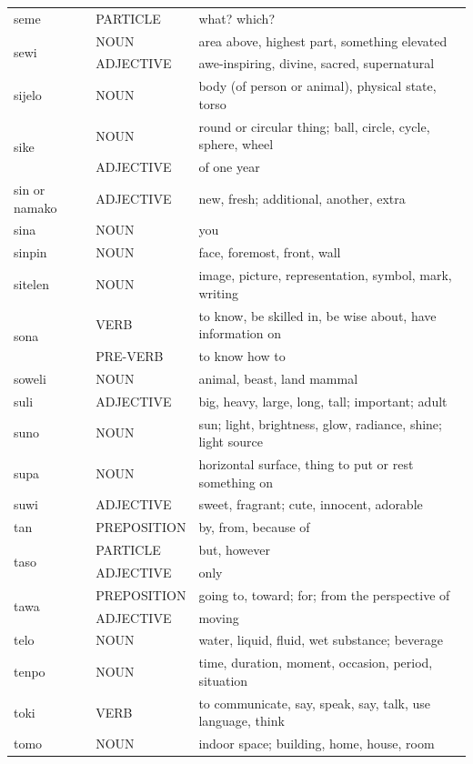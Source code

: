 \documentclass[14pt, a4paper]{extreport}
\begin{document}
\begin{longtable}{llp{10cm}}
  seme & PARTICLE & what? which? \\
  \multirow[t]{2}{*}{sewi} & NOUN & area above, highest part, something elevated \\
  & ADJECTIVE & awe-inspiring, divine, sacred, supernatural \\
  sijelo & NOUN & body (of person or animal), physical state, torso \\
  \multirow[t]{2}{*}{sike} & NOUN & round or circular thing; ball, circle, cycle, sphere, wheel \\
  & ADJECTIVE & of one year \\
  sin or namako & ADJECTIVE & new, fresh; additional, another, extra \\
  sina & NOUN & you \\
  sinpin & NOUN & face, foremost, front, wall \\
  sitelen & NOUN & image, picture, representation, symbol, mark, writing \\
  \multirow[t]{2}{*}{sona} & VERB & to know, be skilled in, be wise about, have information on \\
  & PRE-VERB & to know how to \\
  soweli & NOUN & animal, beast, land mammal \\
  suli & ADJECTIVE & big, heavy, large, long, tall; important; adult \\
  suno & NOUN & sun; light, brightness, glow, radiance, shine; light source \\
  supa & NOUN & horizontal surface, thing to put or rest something on \\
  suwi & ADJECTIVE & sweet, fragrant; cute, innocent, adorable \\
  tan & PREPOSITION & by, from, because of \\
  \multirow[t]{2}{*}{taso} & PARTICLE & but, however \\
  & ADJECTIVE & only \\
  \multirow[t]{2}{*}{tawa} & PREPOSITION & going to, toward; for; from the perspective of \\
  & ADJECTIVE & moving \\
  telo & NOUN & water, liquid, fluid, wet substance; beverage \\
  tenpo & NOUN & time, duration, moment, occasion, period, situation \\
  toki & VERB & to communicate, say, speak, say, talk, use language, think \\
  tomo & NOUN & indoor space; building, home, house, room \\

\end{longtable}
\end{document}
